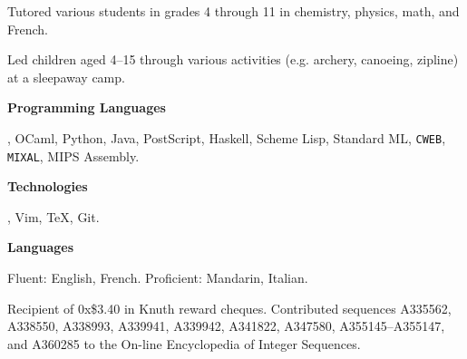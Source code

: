 \smallskip
Tutored various students in grades 4 through 11 in chemistry, physics, math, and French.
\medbreak

\smallskip
Led children aged 4--15 through various activities (e.g. archery, canoeing, zipline) at a sleepaway camp.
\medbreak


{\bf Programming Languages}\par
\CEE, OCaml, Python, Java, PostScript, Haskell, Scheme Lisp,  Standard ML, {\tt CWEB}, {\tt MIXAL},
{\mc MIPS} Assembly.
\medbreak

{\bf Technologies}\par
\UNIX, Vim, \TeX, Git.
\medbreak

{\bf Languages}\par
Fluent: English, French. Proficient: Mandarin, Italian.
\medbreak


\parindent=10pt
\thing Recipient of 0x\$3.40 in Knuth reward cheques.
\smallskip
\thing Contributed sequences A335562, A338550, A338993, A339941, A339942, A341822, A347580,
A355145--A355147, and A360285
to the On-line Encyclopedia of Integer Sequences.
\medbreak

\filbreak

\bye


